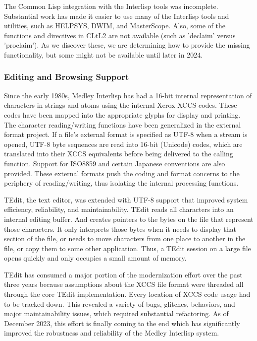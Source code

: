 \documentclass[sigconf]{acmart}
\begin{document}
The Common Lisp integration with the Interlisp tools was incomplete. Substantial work has made it easier to use many of the Interlisp tools and utilities, such as HELPSYS, DWIM, and MasterScope. Also, some of the functions and directives in CLtL2 are not available (such as 'declaim' versus 'proclaim'). As we discover these, we are determining how to provide the missing functionality, but some might not be available until later in 2024.

\subsubsection{Editing and Browsing Support}

Since the early 1980s, Medley Interlisp has had a 16-bit internal representation of characters in strings and atoms using the internal Xerox XCCS codes\cite{Nuyens86}. These codes have been mapped into the appropriate glyphs for display and printing. The character reading/writing functions have been generalized in the external format project. If a file's external format is specified as UTF-8 when a stream is opened, UTF-8 byte sequences are read into 16-bit (Unicode) codes, which are translated into their XCCS equivalents before being delivered to the calling function. Support for ISO8859 and certain Japanese conventions are also provided. These external formats push the coding and format concerns to the periphery of reading/writing, thus isolating the internal processing functions\cite{Kaplan21}.

TEdit, the text editor, was extended with UTF-8 support that improved system efficiency, reliability, and maintainability\cite{Xerox86}. TEdit reads all characters into an internal editing buffer. And creates pointers to the bytes on the file that represent those characters. It only interprets those bytes when it needs to display that section of the file, or needs to move characters from one place to another in the file, or copy them to some other application. Thus, a TEdit session on a large file opens quickly and only occupies a small amount of memory.

TEdit has consumed a major portion of the modernization effort over the past three years because assumptions about the XCCS file format were threaded all through the core TEdit implementation. Every location of XCCS code usage had to be tracked down. This revealed a variety of bugs, glitches, behaviors, and major maintainability issues, which required substantial refactoring. As of December 2023, this effort is finally coming to the end which has significantly improved the robustness and reliability of the Medley Interlisp system.
\end{document}
